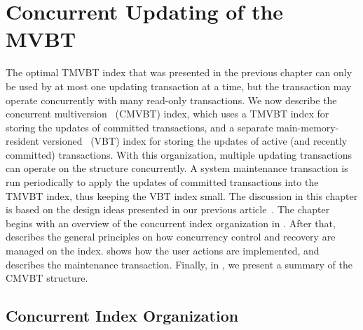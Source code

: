 \chapter{Concurrent Updating of the MVBT}
\label{chapter:cmvbt}
\label{def:cmvbt}

The optimal TMVBT index that was presented in the previous
chapter can only be used by at most one updating transaction at a time, but
the transaction may operate concurrently with many read-only transactions.
We now describe the concurrent multiversion \Btree\ (CMVBT) index, which uses
a TMVBT index for storing the updates of committed transactions, and a
separate main-memory-resident versioned \Btree\ (VBT) index
for storing the updates of active (and recently committed) transactions.
With this organization, multiple updating transactions can operate on the
structure concurrently. 
A system maintenance transaction is run periodically to apply the updates of
committed transactions into the TMVBT index, thus keeping the VBT index
small.
The discussion in this chapter is based on the design ideas presented in our
previous article~\cite{haapasalo:2009:cmvbt}.
The chapter begins with an overview of the concurrent index organization in
.
After that,  describes the general principles
on how concurrency control and recovery are managed on the index.
 shows how the user actions are implemented,
and  describes the maintenance transaction.
Finally, in , we present a summary of the CMVBT
structure.


\section{Concurrent Index Organization}
\label{sec:cmvbt:organization}

